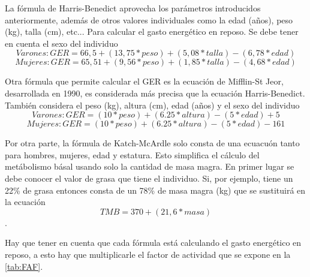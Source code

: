 La fórmula de Harris-Benedict aprovecha los parámetros introducidos anteriormente, además de otros valores individuales como la edad (años), peso (kg), talla (cm), etc... Para calcular el gasto energético en reposo. Se debe tener en cuenta el sexo del individuo \cite{GER}
\begin{equation}
    Varones:GER = 66,5+(13,75*peso)+(5,08*talla)-(6,78*edad)
\end{equation}
\begin{equation}
    Mujeres:GER = 65,51+(9,56*peso)+(1,85*talla)-(4,68*edad)
\end{equation}

Otra fórmula que permite calcular el GER es la ecuación de Mifflin-St Jeor, desarrollada en 1990, es considerada más precisa que la ecuación Harris-Benedict. También considera el peso (kg), altura (cm), edad (años) y el sexo del individuo \cite{CARRASCO2007}
\begin{equation}
    Varones:GER = (10 * peso) + (6.25 * altura) - (5 * edad) + 5
\end{equation}
\begin{equation}
    Mujeres:GER = (10 * peso) + (6.25 * altura) - (5 * edad) - 161
\end{equation}

Por otra parte, la fórmula de Katch-McArdle solo consta de una ecuacuón tanto para hombres, mujeres, edad y estatura. Esto simplifica el cálculo del metábolismo básal usando solo la cantidad de masa magra. En primer lugar se debe conocer el valor de grasa que tiene el individuo. Si, por ejemplo, tiene un 22\% de grasa entonces consta de un 78\% de masa magra (kg) que se sustituirá en la ecuación \cite{Katch-McArdle}
\begin{equation}
    TMB = 370 + (21,6 * masa)
\end{equation}.

Hay que tener en cuenta que cada fórmula está calculando el gasto energético en reposo, a esto hay que multiplicarle el factor de actividad que se expone en la \autoref{tab:FAF}.
